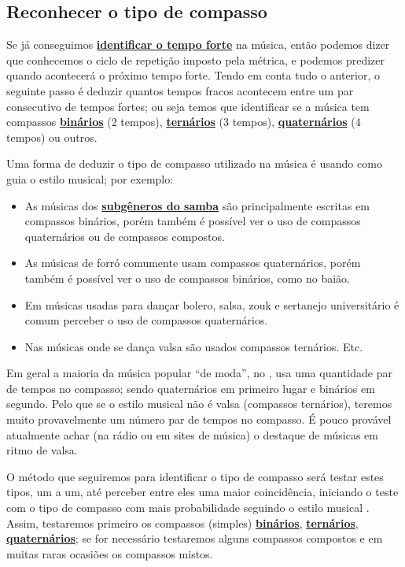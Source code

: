 \subsection{Reconhecer o tipo de compasso}
\label{subsec:pertipodecompasso}
Se já conseguimos \hyperref[subsec:perceberTF1]{\textbf{identificar o tempo forte}} na música,
então podemos dizer que conhecemos o ciclo de repetição imposto pela métrica,
e podemos predizer quando acontecerá o próximo tempo forte.
Tendo em conta tudo o anterior,
o seguinte passo é deduzir quantos tempos fracos acontecem 
entre um par consecutivo de tempos fortes;
ou seja 
temos que identificar se a música tem compassos 
\hyperref[subsec:compassobinario]{\textbf{binários}} (2 tempos), 
\hyperref[subsec:compassoternario]{\textbf{ternários}} (3 tempos), 
\hyperref[subsec:compassoquaternario]{\textbf{quaternários}} (4 tempos) 
ou outros. 

Uma forma de deduzir o tipo de compasso utilizado na música  é usando como guia o estilo musical; por exemplo:
\begin{itemize}
\item As músicas dos \hyperref[sec:FamiliaSamba]{\textbf{subgêneros do samba}} 
são principalmente escritas em compassos binários,
porém também é possível ver o uso de compassos quaternários ou de compassos compostos.
\item As músicas de forró comumente usam compassos quaternários,
porém também é possível ver o uso de compassos binários, como no baião. 
\item Em músicas usadas para dançar bolero, salsa, zouk 
e sertanejo universitário é comum perceber o uso de compassos quaternários.
\item Nas músicas onde se dança valsa são usados compassos ternários. Etc.
\end{itemize}
Em geral a maioria da música popular ``de moda'', no \AnoLivro, usa uma quantidade par de tempos no compasso;
sendo quaternários em primeiro lugar e binários em segundo.
Pelo que se o estilo musical não é valsa (compassos ternários), 
teremos muito provavelmente um número par de tempos no compasso.
É  pouco provável atualmente achar (na rádio ou em sites de música)
o destaque de músicas em ritmo de valsa.

O método que seguiremos para identificar o tipo de compasso será testar estes tipos,
um a um, até perceber entre eles uma maior coincidência,
iniciando o teste com o tipo de compasso com mais probabilidade seguindo o estilo musical \cite[pp. 10]{wright1992social}.
Assim, testaremos primeiro os compassos (simples)
\hyperref[subsec:compassobinario]{\textbf{binários}}, 
\hyperref[subsec:compassoternario]{\textbf{ternários}}, 
\hyperref[subsec:compassoquaternario]{\textbf{quaternários}};
se for necessário testaremos alguns compassos compostos 
e em muitas raras ocasiões os compassos mistos.

